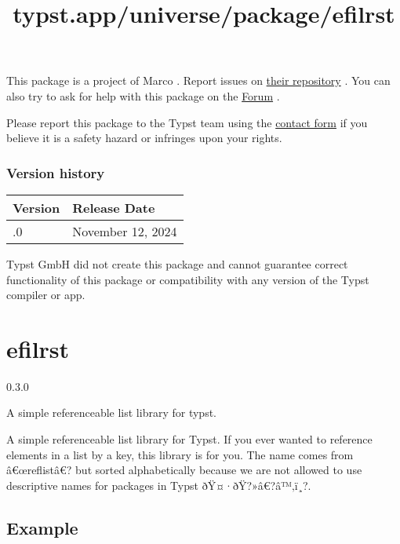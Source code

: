 This package is a project of Marco . Report issues on
\href{https://github.com/mtolk/one-liner}{their repository} . You can
also try to ask for help with this package on the
\href{https://forum.typst.app}{Forum} .

Please report this package to the Typst team using the
\href{https://typst.app/contact}{contact form} if you believe it is a
safety hazard or infringes upon your rights.

\label{versions}
\subsubsection{Version history}\label{version-history}

\begin{longtable}[]{@{}ll@{}}
\toprule\noalign{}
Version & Release Date \\
\midrule\noalign{}
\endhead
\bottomrule\noalign{}
\endlastfoot
0.1.0 & November 12, 2024 \\
\end{longtable}

Typst GmbH did not create this package and cannot guarantee correct
functionality of this package or compatibility with any version of the
Typst compiler or app.


\title{typst.app/universe/package/efilrst}

\label{banner}
\section{efilrst}\label{efilrst}

{ 0.3.0 }

A simple referenceable list library for typst.

\label{readme}
A simple referenceable list library for Typst. If you ever wanted to
reference elements in a list by a key, this library is for you. The name
comes from â€œreflistâ€? but sorted alphabetically because we are not
allowed to use descriptive names for packages in Typst
ðŸ¤·ðŸ?»â€?â™‚ï¸?.

\subsection{Example}\label{example}

